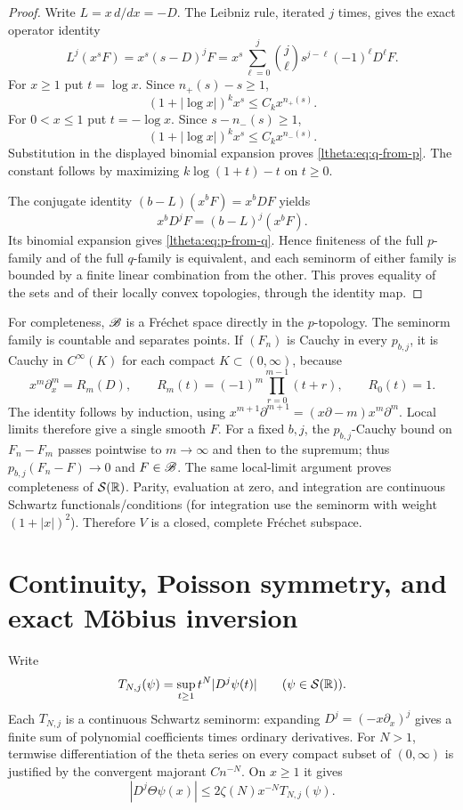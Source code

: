 \documentclass[11pt]{article}
\begin{document}
\begin{proof}
Write $L=x\,d/dx=-D$. The Leibniz rule, iterated $j$ times, gives the
exact operator identity
\[
 L^j(x^sF)=x^s(s-D)^jF
   =x^s\sum_{\ell=0}^j\binom j\ell s^{j-\ell}(-1)^\ell D^\ell F.
\]
For $x\geq1$ put $t=\log x$. Since $n_+(s)-s\geq1$,
\[
 (1+|\log x|)^kx^s\leq C_kx^{n_+(s)}.
\]
For $0<x\leq1$ put $t=-\log x$. Since $s-n_-(s)\geq1$,
\[
 (1+|\log x|)^kx^s\leq C_kx^{n_-(s)}.
\]
Substitution in the displayed binomial expansion proves
\eqref{ltheta:eq:q-from-p}. The constant follows by maximizing
$k\log(1+t)-t$ on $t\geq0$.

The conjugate identity $(b-L)(x^bF)=x^bDF$ yields
\[
 x^bD^jF=(b-L)^j(x^bF).
\]
Its binomial expansion gives \eqref{ltheta:eq:p-from-q}. Hence finiteness of
the full $p$-family and of the full $q$-family is equivalent, and each
seminorm of either family is bounded by a finite linear combination
from the other. This proves equality of the sets and of their locally
convex topologies, through the identity map.
\end{proof}

For completeness, $\mathscr B$ is a Fr\'echet space directly in the $p$-topology.
The seminorm family is countable and separates points. If $(F_n)$ is
Cauchy in every $p_{b,j}$, it is Cauchy in $C^\infty(K)$ for each compact
$K\subset(0,\infty)$, because
\begin{equation}\label{ltheta:eq:R}
 x^m\partial_x^m=R_m(D),\qquad
 R_m(t)=(-1)^m\prod_{r=0}^{m-1}(t+r),\qquad R_0(t)=1.
\end{equation}
The identity follows by induction, using
$x^{m+1}\partial^{m+1}=(x\partial-m)x^m\partial^m$.
Local limits therefore give a single smooth $F$. For a fixed $b,j$,
the $p_{b,j}$-Cauchy bound on $F_n-F_m$ passes pointwise to $m\to\infty$
and then to the supremum; thus $p_{b,j}(F_n-F)\to0$ and $F\in\mathscr B$.
The same local-limit argument proves completeness of $\mathcal S(\mathbb R)$.
Parity, evaluation at zero, and integration are continuous Schwartz
functionals/conditions (for integration use the seminorm with weight
$(1+|x|)^2$). Therefore $V$ is a closed, complete Fr\'echet subspace.

\section{Continuity, Poisson symmetry, and exact M\"obius inversion}

Write
\[
 T_{N,j}(\psi)=\sup_{t\geq1}t^N|D^j\psi(t)|
 \qquad(\psi\in\mathcal S(\mathbb R)).
\]
Each $T_{N,j}$ is a continuous Schwartz seminorm: expanding
$D^j=(-x\partial_x)^j$ gives a finite sum of polynomial coefficients
times ordinary derivatives. For $N>1$, termwise differentiation of
the theta series on every compact subset of $(0,\infty)$ is justified
by the convergent majorant $C n^{-N}$. On $x\geq1$ it gives
\begin{equation}\label{ltheta:eq:theta-tail}
 |D^j\Theta\psi(x)|\leq2\zeta(N)x^{-N}T_{N,j}(\psi).
\end{equation}
\end{document}
